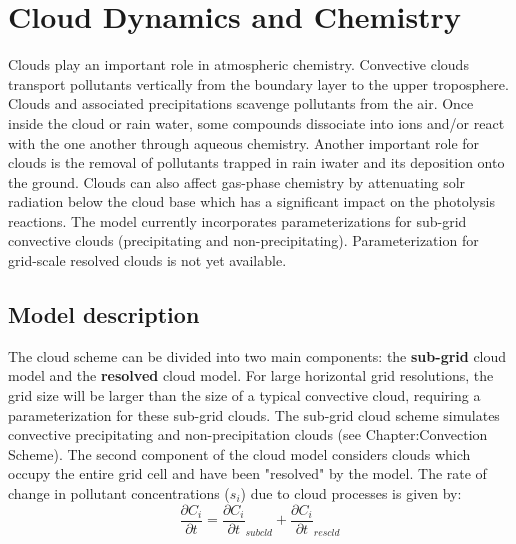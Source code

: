 
\section{Cloud Dynamics and Chemistry}
Clouds play an important role in atmospheric chemistry.
Convective clouds transport pollutants vertically from the boundary layer to 
the upper troposphere. Clouds and associated precipitations scavenge pollutants 
from the air. Once inside the cloud or rain water, some compounds 
dissociate into ions and/or react with the one another through aqueous 
chemistry.
Another important role for clouds is the removal of pollutants trapped in 
rain iwater and its deposition onto the ground. Clouds can also affect 
gas-phase  chemistry by attenuating solr radiation below the cloud base 
which has a significant impact on the photolysis reactions. 
The model currently incorporates parameterizations for sub-grid convective 
clouds (precipitating and non-precipitating). Parameterization for grid-scale 
resolved clouds is not yet available. 
\subsection{Model description}
The cloud scheme can be divided into two main components: the 
{\bf sub-grid} cloud
model and the {\bf resolved} cloud model. 
For large horizontal grid resolutions, the grid size will be larger than the 
size of a typical convective cloud, requiring a parameterization for these
sub-grid clouds. The sub-grid cloud scheme simulates convective 
precipitating and non-precipitation clouds (see Chapter:Convection Scheme).
The second component of the cloud model considers clouds which occupy the 
entire grid cell and have been "resolved" by the model. The rate of change in 
pollutant concentrations ($s_i$) due to cloud processes is given by:
$$
\frac{\partial C_i}{\partial t} = \frac{\partial C_i}{\partial t}_{subcld} + \frac{\partial C_i}{\partial t}_{rescld}
$$
